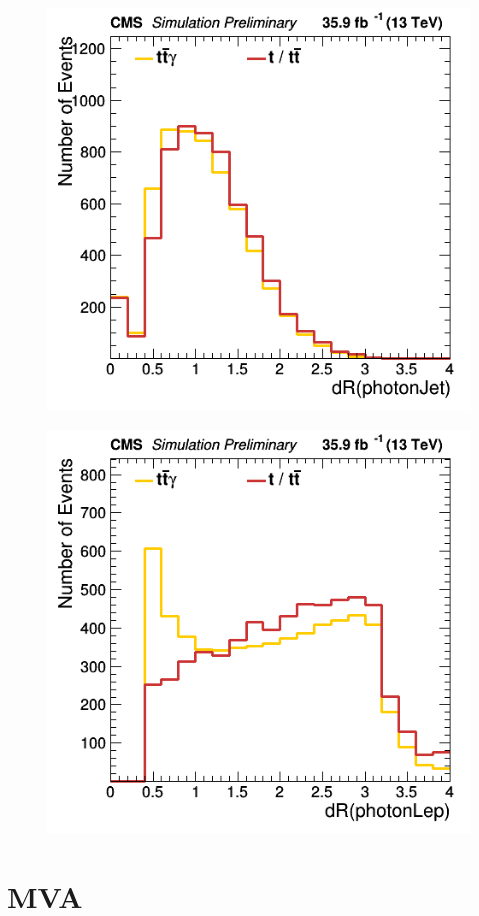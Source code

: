 \documentclass[11pt]{scrartcl}
\begin{document}
	\begin{figure}[H]
	\centering
	\begin{minipage}{.5\textwidth}
	  \centering
	  \includegraphics[width=0.75\linewidth]{figures/Select3/photonJetdR.png}
	  \label{fig:photonJetdR}
	\end{minipage}%
	\begin{minipage}{.5\textwidth}
	  \centering
	  \includegraphics[width=0.75\linewidth]{figures/Select3/photonLepdR.png}
	  \label{fig:photonLepdR}
	\end{minipage}
	\end{figure}

\section{MVA}
\end{document}
